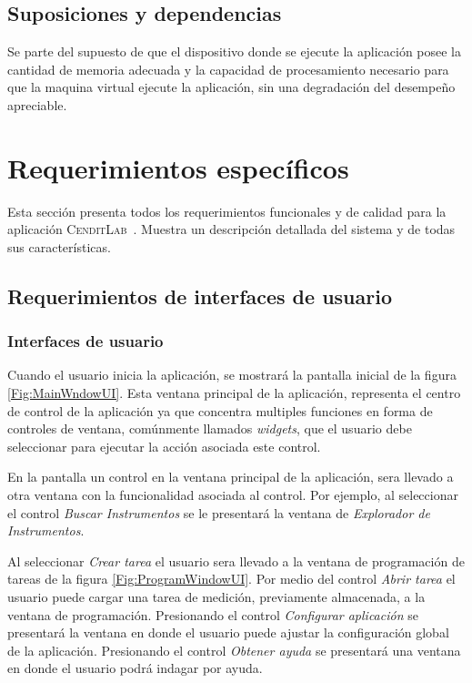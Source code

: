 \documentclass[paper=a4,oneside,fontsize=12pt]{scrartcl}
\newcommand{\AppName}{\textsc{CenditLab}\ }
\begin{document}
	\subsection{Suposiciones y dependencias}	
	
	Se parte del supuesto de que el dispositivo donde se ejecute la aplicación posee la cantidad de memoria adecuada y la capacidad de procesamiento necesario para que la maquina virtual ejecute la aplicación, sin una degradación del desempeño apreciable.
	
	\section{Requerimientos específicos}
	
	Esta sección presenta todos los requerimientos funcionales y de calidad para la aplicación \AppName. Muestra un descripción detallada del sistema y de todas sus características.
	
	\subsection{Requerimientos de interfaces de usuario}
	
	\subsubsection{Interfaces de usuario}
	
	Cuando el usuario inicia la aplicación, se mostrará la pantalla inicial de la figura \ref{Fig:MainWndowUI}. Esta ventana principal de la aplicación, representa el centro de control de la aplicación ya que concentra multiples funciones en forma de controles de ventana, comúnmente llamados \emph{widgets}, que el usuario debe seleccionar para ejecutar la acción asociada este control. 
	
	En la pantalla un control en la ventana principal de la aplicación, sera llevado a otra ventana con la funcionalidad asociada al control. Por ejemplo, al seleccionar el control \emph{Buscar Instrumentos} se le presentará la ventana de \emph{Explorador de Instrumentos}. 
	
	Al seleccionar \emph{Crear tarea} el usuario sera llevado a la ventana de programación de tareas de la figura \ref{Fig:ProgramWindowUI}. Por medio del control \emph{Abrir tarea} el usuario puede cargar una tarea de medición, previamente almacenada, a la ventana de programación. Presionando el control \emph{Configurar aplicación} se presentará la ventana en donde el usuario puede ajustar la configuración global de la aplicación. Presionando el control \emph{Obtener ayuda} se presentará una ventana en donde el usuario podrá indagar por ayuda.	
	
\end{document}
